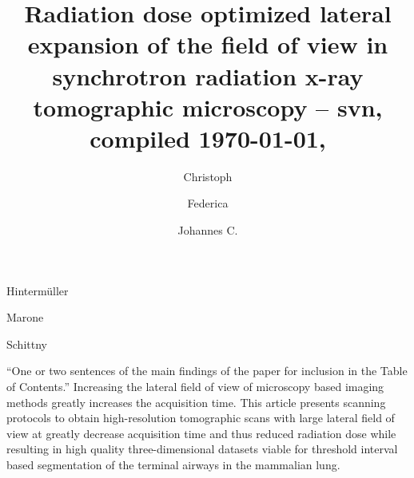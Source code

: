 \documentclass[preprint,s]{iucr}
\begin{document}
\title{Radiation dose optimized lateral expansion of the field of view in synchrotron radiation x-ray tomographic microscopy %
	-- svn, compiled \today, \thistime}

\author[b]{Christoph}{Hinterm\"{u}ller}{}{}
\author[b]{Federica}{Marone}{}{}
\author[a]{Johannes C.}{Schittny}{}{}



\maketitle

\begin{synopsis}
``One or two sentences of the main findings of the paper for inclusion in the Table of Contents.''
Increasing the lateral field of view of microscopy based imaging methods greatly increases the acquisition time. This article presents scanning protocols to obtain high-resolution tomographic scans with large lateral field of view at greatly decrease acquisition time and thus reduced radiation dose while resulting in high quality three-dimensional datasets viable for threshold interval based segmentation of the terminal airways in the mammalian lung.
\end{synopsis}
\end{document}
